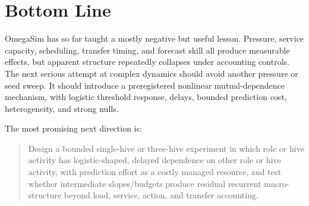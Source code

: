 \documentclass[11pt]{article}
\begin{document}
\section{Bottom Line}

OmegaSim has so far taught a mostly negative but useful lesson. Pressure,
service capacity, scheduling, transfer timing, and forecast skill all produce
measurable effects, but apparent structure repeatedly collapses under
accounting controls. The next serious attempt at complex dynamics should avoid
another pressure or seed sweep. It should introduce a preregistered nonlinear
mutual-dependence mechanism, with logistic threshold response, delays, bounded
prediction cost, heterogeneity, and strong nulls.

The most promising next direction is:

\begin{quote}
Design a bounded single-hive or three-hive experiment in which role or hive
activity has logistic-shaped, delayed dependence on other role or hive
activity, with prediction effort as a costly managed resource, and test whether
intermediate slopes/budgets produce residual recurrent macro-structure beyond
load, service, action, and transfer accounting.
\end{quote}
\end{document}
